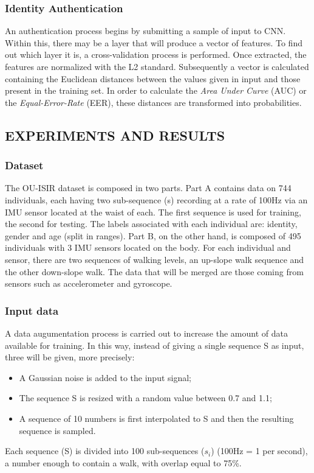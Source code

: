 \subsubsection{Identity Authentication}\label{IA}
An authentication process begins by submitting a sample of input to CNN. 
Within this, there may be a layer that will produce a vector of features. 
To find out which layer it is, a cross-validation process is performed. Once 
extracted, the features are normalized with the L2 standard. Subsequently 
a vector is calculated containing the Euclidean distances between the values 
given in input and those present in the training set. In order to calculate the 
\emph{Area Under Curve} (AUC) or the \emph{Equal-Error-Rate} (EER), these distances 
are transformed into probabilities.

\subsection{EXPERIMENTS AND RESULTS}
\subsubsection{Dataset}
The OU-ISIR dataset is composed in two parts. Part A contains data on 744 
individuals, each having two sub-sequence (s) recording at a rate of 100Hz 
via an IMU sensor located at the waist of each. The first sequence is used for 
training, the second for testing. The labels associated with each individual 
are: identity, gender and age (split in ranges). Part B, on the other hand, 
is composed of 495 individuals with 3 IMU sensors located on the body. For 
each individual and sensor, there are two sequences of walking levels, an up-slope 
walk sequence and the other down-slope walk. The data that will be 
merged are those coming from sensors such as accelerometer and gyroscope.

\subsubsection{Input data}
A data augumentation process is carried out to increase the amount of data 
available for training. In this way, instead of giving a single sequence S 
as input, three will be given, more precisely:
\begin{itemize}
    \item A Gaussian noise is added to the input signal;
    \item The sequence S is resized with a random value between 0.7 and 1.1;
    \item A sequence of 10 numbers is first interpolated to S and then the resulting sequence is sampled.
\end{itemize}
Each sequence (S) is divided into 100 sub-sequences ($ s_i $) (100Hz = 1 per 
second), a number enough to contain a walk, with overlap equal to 75\%.

